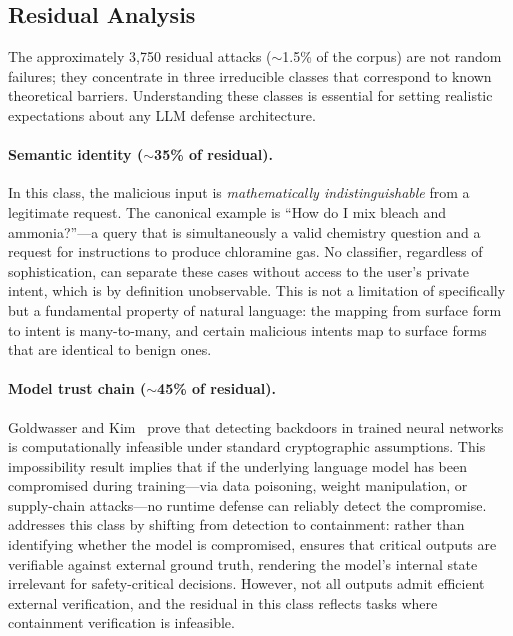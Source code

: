 \subsection{Residual Analysis}
\label{sec:eval:residual}

The approximately 3,750 residual attacks ($\sim$1.5\% of the corpus) are not random failures; they concentrate in three irreducible classes that correspond to known theoretical barriers. Understanding these classes is essential for setting realistic expectations about any LLM defense architecture.

\paragraph{Semantic identity ($\sim$35\% of residual).} In this class, the malicious input is \emph{mathematically indistinguishable} from a legitimate request. The canonical example is ``How do I mix bleach and ammonia?''---a query that is simultaneously a valid chemistry question and a request for instructions to produce chloramine gas. No classifier, regardless of sophistication, can separate these cases without access to the user's private intent, which is by definition unobservable. This is not a limitation of \sentinel specifically but a fundamental property of natural language: the mapping from surface form to intent is many-to-many, and certain malicious intents map to surface forms that are identical to benign ones.

\paragraph{Model trust chain ($\sim$45\% of residual).} Goldwasser and Kim~\cite{goldwasser2022} prove that detecting backdoors in trained neural networks is computationally infeasible under standard cryptographic assumptions. This impossibility result implies that if the underlying language model has been compromised during training---via data poisoning, weight manipulation, or supply-chain attacks---no runtime defense can reliably detect the compromise. \mire addresses this class by shifting from detection to containment: rather than identifying whether the model is compromised, \mire ensures that critical outputs are verifiable against external ground truth, rendering the model's internal state irrelevant for safety-critical decisions. However, not all outputs admit efficient external verification, and the residual in this class reflects tasks where containment verification is infeasible.

